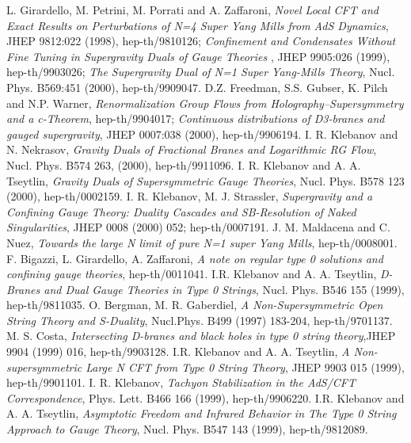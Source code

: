 \documentclass[a4paper,12pt]{article}
\begin{document}
\begin{thebibliography}{99}

L. Girardello, M. Petrini, M. Porrati and A. Zaffaroni, {\it Novel Local CFT and Exact Results on Perturbations of N=4 Super Yang Mills from AdS Dynamics}, JHEP 9812:022 (1998), 
hep-th/9810126; {\it  Confinement and Condensates Without Fine Tuning in Supergravity Duals of Gauge Theories }, JHEP 9905:026 (1999), hep-th/9903026; {\it The Supergravity Dual of N=1 Super Yang-Mills Theory}, 
Nucl. Phys. B569:451 (2000), hep-th/9909047. 
D.Z. Freedman, S.S. Gubser, K. Pilch and N.P. Warner, {\it Renormalization Group Flows from Holography--Supersymmetry and a c-Theorem}, hep-th/9904017; {\it Continuous distributions of D3-branes and gauged supergravity}, JHEP 0007:038 (2000), hep-th/9906194.
 I. R. Klebanov and N. Nekrasov, {\it Gravity Duals of Fractional Branes and Logarithmic RG Flow}, Nucl. Phys. B574 263, (2000), hep-th/9911096.
I. R. Klebanov and A. A. Tseytlin, {\it Gravity Duals of Supersymmetric \coordHE{} Gauge Theories}, Nucl. Phys. B578 123 (2000), hep-th/0002159.  
I. R. Klebanov, M. J. Strassler, {\it Supergravity and a Confining Gauge Theory: Duality Cascades and \myHighlight{$\chi$}\coordHE{}SB-Resolution of Naked Singularities}, JHEP 0008 (2000) 052; hep-th/0007191. 
J. M. Maldacena and C. Nu\coordHE{}ez, {\it Towards the large N limit of pure N=1 super Yang Mills}, hep-th/0008001.
 F. Bigazzi, L. Girardello, A. Zaffaroni, {\it A note on regular type 0 solutions and confining gauge theories}, hep-th/0011041.
 I.R. Klebanov and A. A. Tseytlin, {\it D-Branes and Dual Gauge Theories 
in Type 0 Strings}, Nucl. Phys. B546 155 (1999), hep-th/9811035.
O. Bergman, M. R. Gaberdiel, {\it A Non-Supersymmetric Open String Theory and S-Duality}, Nucl.Phys. B499 (1997) 183-204, hep-th/9701137.
 M. S. Costa, {\it Intersecting D-branes and black holes in type 0 string theory},JHEP 9904 (1999) 016, hep-th/9903128.
 I.R. Klebanov and A. A. Tseytlin, {\it A Non-supersymmetric Large N CFT from Type 0 String Theory}, JHEP 9903 015 (1999), hep-th/9901101.
I. R. Klebanov, {\it Tachyon Stabilization in the AdS/CFT Correspondence}, Phys. Lett. B466 166 (1999), hep-th/9906220.
 I.R. Klebanov and A. A. Tseytlin, {\it Asymptotic Freedom and Infrared Behavior in The Type 0 String Approach to Gauge Theory}, Nucl. Phys. B547 143 (1999), hep-th/9812089.

\end{thebibliography}
\end{document}
